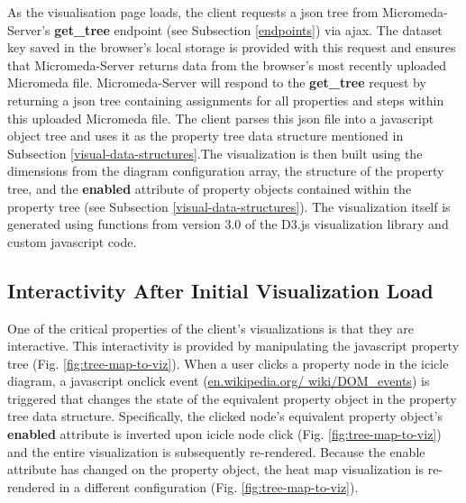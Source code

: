 As the visualisation page loads, the client requests a \gls{json} tree from 
Micromeda-Server's \textbf{get\_tree} endpoint (see Subsection \ref{endpoints}) 
via \gls{ajax}. The dataset key saved in the browser's local storage is provided 
with this request and ensures that Micromeda-Server returns data from the 
browser's most recently uploaded Micromeda file. Micromeda-Server will respond 
to the \textbf{get\_tree} request by returning a \gls{json} tree containing 
assignments for all properties and steps within this uploaded Micromeda file. 
The client parses this \gls{json} file into a \gls{javascript} object tree and 
uses it as the property tree data structure mentioned in Subsection 
\ref{visual-data-structures}.The visualization is then built using the 
dimensions from the diagram configuration array, the structure of the property 
tree, and the \textbf{enabled} attribute of property objects contained within 
the property tree (see Subsection \ref{visual-data-structures}). The 
visualization itself is generated using functions from version 3.0 of the D3.js 
visualization library \cite{bostock2015d3} and custom \gls{javascript} code.

\subsection{Interactivity After Initial Visualization Load}

One of the critical properties of the client's visualizations is that they are 
interactive. This interactivity is provided by manipulating the \gls{javascript} 
property tree (Fig. \ref{fig:tree-map-to-viz}). When a user clicks a property 
node in the icicle diagram, a \gls{javascript} onclick event \cite{dom-events} 
(\href{http://en.wikipedia.org/wiki/DOM_events}{en.wikipedia.org/ 
wiki/DOM\_events}) is triggered that changes the state of the equivalent 
property object in the property tree data structure. Specifically, the clicked 
node's equivalent property object's \textbf{enabled} attribute is inverted upon 
icicle node click (Fig. \ref{fig:tree-map-to-viz}) and the entire visualization 
is subsequently re-rendered. Because the enable attribute has changed on the 
property object, the heat map visualization is re-rendered in a different 
configuration (Fig. \ref{fig:tree-map-to-viz}). 


